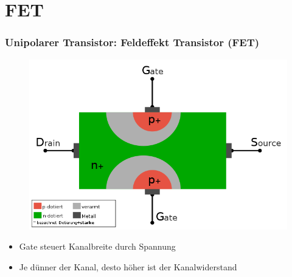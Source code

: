 \section*{FET}
\begin{frame}
  \frametitle{Unipolarer Transistor: Feldeffekt Transistor (FET)}
  \begin{center}
    \begin{figure}
      \includegraphics[width=\textwidth,height=.6\textheight,keepaspectratio]{a06/FET-aufbau.png}
    \end{figure}
    \begin{itemize}
      \item Gate steuert Kanalbreite durch Spannung
      \item Je dünner der Kanal, desto höher ist der Kanalwiderstand
    \end{itemize}
  \end{center}
\end{frame}

